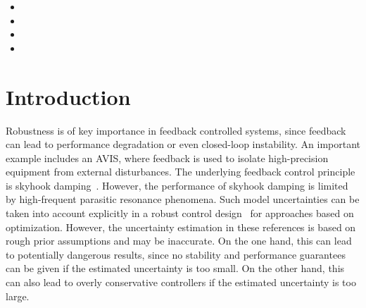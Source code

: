  \begin{itemize}
    \item {}
    \item {}
    \item {}
    \item {}
  \end{itemize}

\newcommand{\wnValue}{\ensuremath{0.95 \unit{rad/s}}}
\newcommand{\dampingValue}{\ensuremath{0.025}}
\newcommand{\TsValue}{\ensuremath{1 \unit{s}}}

\section{Introduction}
\label{sec:Intro}

Robustness is of key importance in feedback controlled systems, since feedback can lead to performance degradation or even closed-loop instability. 
An important example includes an \gls{AVIS}, where feedback is used to isolate high-precision equipment from external disturbances. 
The underlying feedback control principle is skyhook damping~\citep{Karnopp1995}. 
However, the performance of skyhook damping is limited by high-frequent parasitic resonance phenomena. 
Such model uncertainties can be taken into account explicitly in a robust control design~\citep{Zhang2005HybridAvis} for approaches based on \Hinf{} optimization.
However, the uncertainty estimation in these references is based on rough prior assumptions and may be inaccurate. 
On the one hand, this can lead to potentially dangerous results, since no stability and performance guarantees can be given if the estimated uncertainty is too small. 
On the other hand, this can also lead to overly conservative controllers if the estimated uncertainty is too large.

